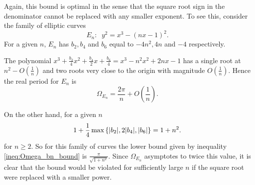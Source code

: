 \documentclass[10pt]{article}
\begin{document}
Again, this bound is optimal in the sense that the square root sign in the denominator cannot be replaced with any smaller exponent. To see this, consider the family of elliptic curves
\begin{equation}
E_n: \;\; y^2 = x^3 - (nx-1)^2.
\end{equation}
For a given $n$, $E_n$ has $b_2,b_4$ and $b_6$ equal to $-4n^2,4n$ and $-4$ respectively.

The polynomial $x^3 + \frac{b_2}{4} x^2 + \frac{b_4}{2} x + \frac{b_6}{4} = x^3 -n^2 x^2 + 2n x - 1$ has a single root at $n^2 - O(\frac{1}{n})$ and two roots very close to the origin with magnitude $O(\frac{1}{n})$. Hence the real period for $E_n$ is
\begin{equation}
\Omega_{E_n} = \frac{2\pi}{n} + O\left(\frac{1}{n}\right).
\end{equation}

On the other hand, for a given $n$
\begin{equation}
1+\frac{1}{4}\max\left\{|b_2|,2|b_4|,|b_6|\right\} = 1+n^2.
\end{equation}
for $n\ge 2$. So for this family of curves the lower bound given by inequality \ref{ineq:Omega_bn_bound} is $\frac{\pi}{\sqrt{1+n^2}}$. Since $\Omega_{E_n}$ asymptotes to twice this value, it is clear that the bound would be violated for sufficiently large $n$ if the square root were replaced with a smaller power. \\
\end{document}
